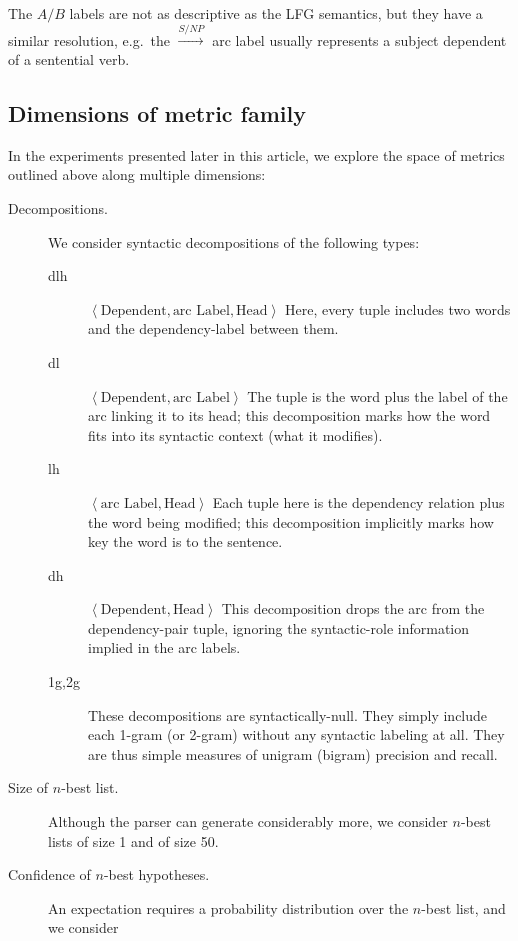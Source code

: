\documentclass{kluwer}    %
\begin{document}
\begin{article}
The $A/B$ labels are not as descriptive as the LFG semantics, but they
have a similar resolution, e.g.\ the $\stackrel{S/NP}{\to}$ arc label
usually represents a subject dependent of a sentential verb.

\subsection{Dimensions of metric family}
\label{sec:metricdimensions}
In the experiments presented later in this article, we explore the
space of metrics outlined above along multiple dimensions:
\begin{description}
\item[Decompositions.] We consider syntactic decompositions of the
  following types:
  \begin{description}
  \item[dlh] $\left\langle \textrm{Dependent}, \textrm{arc Label},
      \textrm{Head}\right\rangle$ Here, every tuple includes two words
    and the dependency-label between them.
  \item[dl] $\left\langle \textrm{Dependent}, \textrm{arc Label}
      \right\rangle$ The tuple is the word plus the label of the arc
      linking it to its head; this decomposition marks how the word
      fits into its syntactic context (what it modifies).
    \item[lh] $\left\langle \textrm{arc Label}, \textrm{Head}
      \right\rangle$ Each tuple here is the dependency relation plus
      the word being modified; this decomposition implicitly marks how
      key the word is to the sentence.
    \item[dh] $\left\langle \textrm{Dependent}, \textrm{Head}
      \right\rangle$ This decomposition drops the arc from the
      dependency-pair tuple, ignoring the syntactic-role information
      implied in the arc labels.
    \item[1g,2g] These decompositions are syntactically-null.  They
      simply include each 1-gram (or 2-gram) without any syntactic
      labeling at all.  They are thus simple measures of unigram
      (bigram) precision and recall.
  \end{description}
\item[Size of $n$-best list.] Although the parser can generate
  considerably more, we consider $n$-best lists of size 1 and of size
  50.
\item[Confidence of $n$-best hypotheses.] An expectation requires a
  probability distribution over the $n$-best list, and we consider

\end{description}
\end{article}
\end{document}
